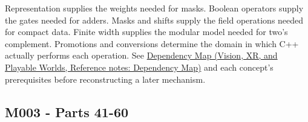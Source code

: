 Representation supplies the weights needed for masks. Boolean operators supply the gates needed for adders. Masks and shifts supply the field operations needed for compact data. Finite width supplies the modular model needed for two's complement. Promotions and conversions determine the domain in which C++ actually performs each operation. See \href{../07-Vision-XR-and-Playable-Worlds/main.pdf\#nameddest=appendix-4ad47bdd269a}{Dependency Map (Vision, XR, and Playable Worlds, Reference notes: Dependency Map)} and each concept's prerequisites before reconstructing a later mechanism.

\subsection{M003 - Parts 41-60}\label{appendix-fd090d982a15-m003---parts-41-60}

